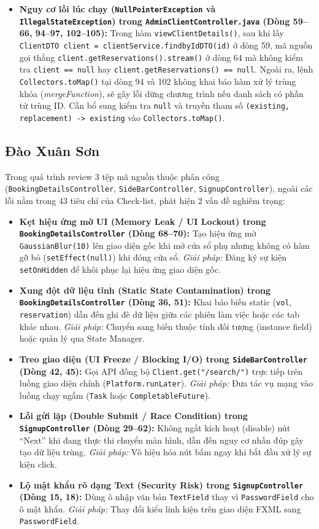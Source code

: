 \documentclass[12pt,a4paper]{article}
\begin{document}
\begin{itemize}
  \item \textbf{Nguy cơ lỗi lúc chạy (\texttt{NullPointerException} và \texttt{IllegalStateException}) trong \texttt{AdminClientController.java} (Dòng 59--66, 94--97, 102--105):} Trong hàm \texttt{viewClientDetails()}, sau khi lấy \texttt{ClientDTO client = clientService.findbyIdDTO(id)} ở dòng 59, mã nguồn gọi thẳng \texttt{client.getReservations().stream()} ở dòng 64 mà không kiểm tra \texttt{client == null} hay \texttt{client.getReservations() == null}. Ngoài ra, lệnh \texttt{Collectors.toMap()} tại dòng 94 và 102 không khai báo hàm xử lý trùng khóa (\textit{mergeFunction}), sẽ gây lỗi dừng chương trình nếu danh sách có phần tử trùng ID. Cần bổ sung kiểm tra \texttt{null} và truyền tham số \texttt{(existing, replacement) -> existing} vào \texttt{Collectors.toMap()}.
\end{itemize}

\subsection{Đào Xuân Sơn}
Trong quá trình review 3 tệp mã nguồn thuộc phân công (\texttt{BookingDetailsController}, \texttt{SideBarController}, \texttt{SignupController}), ngoài các lỗi nằm trong 43 tiêu chí của Check-list, phát hiện 2 vấn đề nghiêm trọng:
\begin{itemize}
  \item \textbf{Kẹt hiệu ứng mờ UI (Memory Leak / UI Lockout) trong \texttt{BookingDetailsController} (Dòng 68--70):} Tạo hiệu ứng mờ \texttt{GaussianBlur(10)} lên giao diện gốc khi mở cửa sổ phụ nhưng không có hàm gỡ bỏ (\texttt{setEffect(null)}) khi đóng cửa sổ. \textit{Giải pháp:} Đăng ký sự kiện \texttt{setOnHidden} để khôi phục lại hiệu ứng giao diện gốc.
  \item \textbf{Xung đột dữ liệu tĩnh (Static State Contamination) trong \texttt{BookingDetailsController} (Dòng 36, 51):} Khai báo biến static (\texttt{vol}, \texttt{reservation}) dẫn đến ghi đè dữ liệu giữa các phiên làm việc hoặc các tab khác nhau. \textit{Giải pháp:} Chuyển sang biến thuộc tính đối tượng (instance field) hoặc quản lý qua State Manager.
  \item \textbf{Treo giao diện (UI Freeze / Blocking I/O) trong \texttt{SideBarController} (Dòng 42, 45):} Gọi API đồng bộ \texttt{Client.get("/search/")} trực tiếp trên luồng giao diện chính (\texttt{Platform.runLater}). \textit{Giải pháp:} Đưa tác vụ mạng vào luồng chạy ngầm (\texttt{Task} hoặc \texttt{CompletableFuture}).
  \item \textbf{Lỗi gửi lặp (Double Submit / Race Condition) trong \texttt{SignupController} (Dòng 29--62):} Không ngắt kích hoạt (disable) nút ``Next'' khi đang thực thi chuyển màn hình, dẫn đến nguy cơ nhấn đúp gây tạo dữ liệu trùng. \textit{Giải pháp:} Vô hiệu hóa nút bấm ngay khi bắt đầu xử lý sự kiện click.
  \item \textbf{Lộ mật khẩu rõ dạng Text (Security Risk) trong \texttt{SignupController} (Dòng 15, 18):} Dùng ô nhập văn bản \texttt{TextField} thay vì \texttt{PasswordField} cho ô mật khẩu. \textit{Giải pháp:} Thay đổi kiểu linh kiện trên giao diện FXML sang \texttt{PasswordField}.
\end{itemize}
\end{document}
